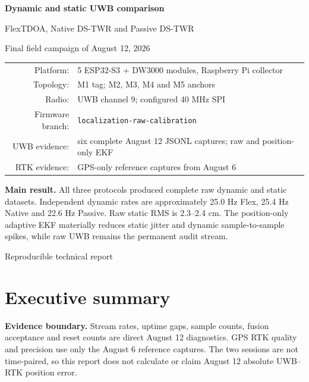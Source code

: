 \documentclass[10pt,a4paper]{article}
\begin{document}
\begin{titlepage}
\centering
\vspace*{18mm}
{\Huge\bfseries Dynamic and static UWB comparison\par}
\vspace{4mm}
{\Large FlexTDOA, Native DS-TWR and Passive DS-TWR\par}
\vspace{14mm}
{\large Final field campaign of August 12, 2026\par}
\vspace{12mm}
\begin{tabular}{rl}
Platform: & 5 ESP32-S3 + DW3000 modules, Raspberry Pi collector\\
Topology: & M1 tag; M2, M3, M4 and M5 anchors\\
Radio: & UWB channel 9; configured 40 MHz SPI\\
Firmware branch: & \texttt{localization-raw-calibration}\\
UWB evidence: & six complete August 12 JSONL captures; raw and position-only EKF\\
RTK evidence: & GPS-only reference captures from August 6\\
\end{tabular}
\vfill
\colorbox{info}{\parbox{0.88\textwidth}{\vspace{2mm}
\textbf{Main result.} All three protocols produced complete raw dynamic and
static datasets. Independent dynamic rates are approximately 25.0 Hz Flex,
25.4 Hz Native and 22.6 Hz Passive. Raw static RMS is 2.3--2.4 cm. The
position-only adaptive EKF materially reduces static jitter and dynamic
sample-to-sample spikes, while raw UWB remains the permanent audit stream.\vspace{2mm}}}
\vfill
{\large Reproducible technical report\par}
\end{titlepage}
\tableofcontents
\clearpage
{}

\section{Executive summary}
\colorbox{warning}{\parbox{0.96\textwidth}{\textbf{Evidence boundary.}
Stream rates, uptime gaps, sample counts, fusion acceptance and reset counts are
direct August 12 diagnostics. GPS RTK quality and precision use only the August
6 reference captures. The two sessions are not time-paired, so this report does
not calculate or claim August 12 absolute UWB--RTK position error.}}
\end{document}
